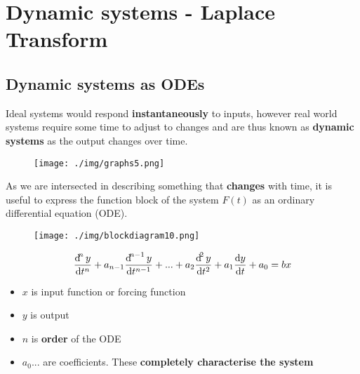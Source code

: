\section{Dynamic systems - Laplace Transform}
\subsection{Dynamic systems as ODEs}
Ideal systems would respond \textbf{instantaneously} to inputs, however real world systems require some time to adjust to changes and are thus known as \textbf{dynamic systems} as the output changes over time.
\begin{figure}[H]
  \centering
  \texttt{[image: ./img/graphs5.png]}
\end{figure}
As we are intersected in describing something that \textbf{changes} with time, it is useful to express the function block of the system $F(t)$ as an ordinary differential equation (ODE).
\begin{figure}[H]
  \centering
  \texttt{[image: ./img/blockdiagram10.png]}
\end{figure}
\begin{equation}
  \frac{\dif^n y}{\dif t^n} + a_{n-1}\frac{\dif^{n-1}y}{\dif t^{n-1}} + ... + a_2 \frac{\dif^2y}{\dif t^2} + a_1 \frac{\dif y}{\dif t} + a_0 = bx
\end{equation}
\begin{itemize}
  \item $x$ is input function or forcing function
  \item $y$ is output
  \item $n$ is \textbf{order} of the ODE
  \item $a_0...$ are coefficients. These \textbf{completely characterise the system}
\end{itemize}
